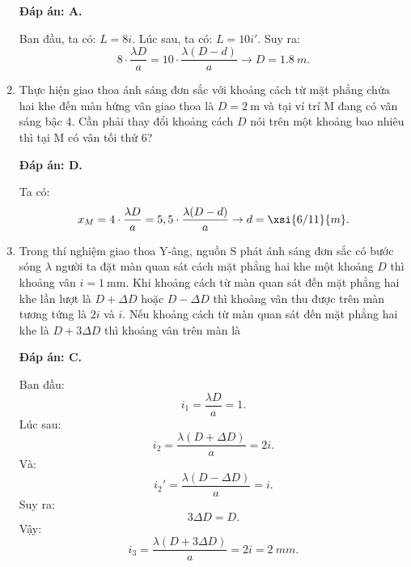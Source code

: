 \begin{enumerate}[label=\bfseries Câu \arabic*:]
	\loigiai
	{		\textbf{Đáp án: A.}
		
Ban đầu, ta có: $ L = 8i. $ Lúc sau, ta có: $ L = 10i' $. Suy ra:
$$
	8 \cdot \dfrac{\lambda D}{a} = 10 \cdot \dfrac{\lambda (D-d)}{a} \rightarrow D = \SI{1,8}{m}.
$$
			
	}
	
	\item {} 
		\cauhoi
	{Thực hiện giao thoa ánh sáng đơn sắc với khoảng cách từ mặt phẳng chứa hai khe đến màn hứng vân giao thoa là $D=\SI{2}{\meter}$ và tại ví trí M đang có vân sáng bậc 4. Cần phải thay đổi khoảng cách $D$ nói trên một khoảng bao nhiêu thì tại M có vân tối thứ 6?
	}	
	
	\loigiai
	{		\textbf{Đáp án: D.}
		
Ta có:
$$
	x_{M} = 4 \cdot \dfrac{\lambda D}{a} = 5,5 \cdot \dfrac{\lambda (D-d)}{a} \rightarrow d = \xsi{6/11}{m}.
$$
		
	}
	
	\item {} 
		\cauhoi
	{Trong thí nghiệm giao thoa Y-âng, nguồn S phát ánh sáng đơn sắc có bước sóng $\lambda$ người ta đặt màn quan sát cách mặt phẳng hai khe một khoảng $D$ thì khoảng vân $i=\SI{1}{\milli \meter}$. Khi khoảng cách từ màn quan sát đến mặt phẳng hai khe lần lượt là $D+\Delta D$ hoặc $D-\Delta D$ thì khoảng vân thu được trên màn tương tứng là $2i$ và $i$. Nếu khoảng cách từ màn quan sát đến mặt phẳng hai khe là $D+3\Delta D$ thì khoảng vân trên màn là
	}
	
	\loigiai
	{		\textbf{Đáp án: C.}
		
Ban đầu:
$$
	i_{1} = \dfrac{\lambda D}{a} = 1.
$$
Lúc sau:
$$
	i_{2} = \dfrac{\lambda (D + \Delta D)}{a} = 2i. 
$$
Và:
$$
i_{2}' = \dfrac{\lambda (D - \Delta D)}{a} = i. 
$$
Suy ra:
$$
	3\Delta D = D.
$$		
Vậy:
$$
	i_{3} = \dfrac{\lambda (D + 3\Delta D)}{a} = 2i = \SI{2}{mm}.
$$
	}
	

\end{enumerate}

